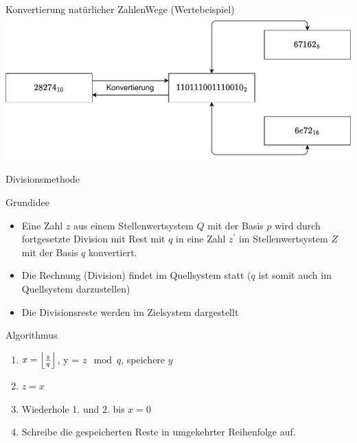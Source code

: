 \documentclass[xelatex,aspectratio=169]{beamer}
\begin{document}
\begin{frame}{Konvertierung natürlicher Zahlen}{Wege (Wertebeispiel)}
  \includegraphics[width=\textwidth]{fig/zahlensysteme_umwandlung_werte.pdf}
\end{frame}

\begin{frame}{Divisionsmethode}
  \begin{block}{Grundidee}
    \begin{itemize}
      \item Eine Zahl $z$ aus einem Stellenwertsystem $Q$ mit der Basis $p$ wird durch fortgesetzte Division mit Rest mit $q$ in eine Zahl $z^{'}$ im Stellenwertsystem $Z$ mit der Basis $q$ konvertiert.
      \item Die Rechnung (Division) findet im Quellsystem statt ($q$ ist somit auch im Quellsystem darzustellen)
      \item Die Divisionsreste werden im Zielsystem dargestellt
    \end{itemize}
  \end{block}
  \begin{block}{Algorithmus}
    \begin{enumerate}
      \item $x = \floor*{\frac{z}{q}}$, y = $z \mod q$, speichere $y$
      \item $z = x$
      \item Wiederhole 1. und 2. bis $x = 0$
      \item Schreibe die gespeicherten Reste in umgekehrter Reihenfolge auf.
    \end{enumerate}

  \end{block}

\end{frame}
\end{document}
